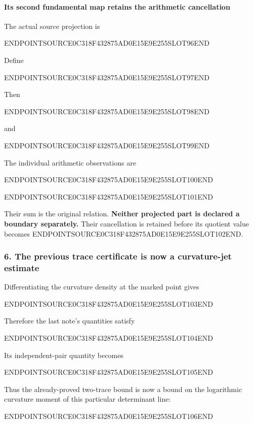 \paragraph{Its second fundamental map retains the arithmetic cancellation}\label{endpoint-curvature_original--its-second-fundamental-map-retains-the-arithmetic-cancellation}

The actual source projection is

ENDPOINTSOURCE0C318F432875AD0E15E9E255SLOT96END

Define

ENDPOINTSOURCE0C318F432875AD0E15E9E255SLOT97END

Then

ENDPOINTSOURCE0C318F432875AD0E15E9E255SLOT98END

and

ENDPOINTSOURCE0C318F432875AD0E15E9E255SLOT99END

The individual arithmetic observations are

ENDPOINTSOURCE0C318F432875AD0E15E9E255SLOT100END

ENDPOINTSOURCE0C318F432875AD0E15E9E255SLOT101END

Their sum is the original relation. \textbf{Neither projected part is declared a boundary separately.} Their cancellation is retained before its quotient value becomes ENDPOINTSOURCE0C318F432875AD0E15E9E255SLOT102END.

\subsubsection{6. The previous trace certificate is now a curvature-jet estimate}\label{endpoint-curvature_original--the-previous-trace-certificate-is-now-a-curvature-jet-estimate}

Differentiating the curvature density at the marked point gives

ENDPOINTSOURCE0C318F432875AD0E15E9E255SLOT103END

Therefore the last note's quantities satisfy

ENDPOINTSOURCE0C318F432875AD0E15E9E255SLOT104END

Its independent-pair quantity becomes

ENDPOINTSOURCE0C318F432875AD0E15E9E255SLOT105END

Thus the already-proved two-trace bound is now a bound on the logarithmic curvature moment of this particular determinant line:

ENDPOINTSOURCE0C318F432875AD0E15E9E255SLOT106END

